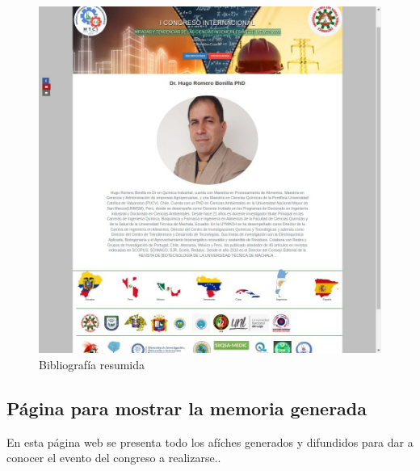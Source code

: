 \documentclass[a4paper,14px]{article}
\begin{document}
\hspace{0.5cm}
\begin{minipage}[H]{0.5\linewidth}
  \begin{figure}[H]
    \centering
    \includegraphics[scale=0.3]{bibliografia2.jpg}
    \caption{Bibliografía resumida}
    \label{fig:bibliografia}
  \end{figure}
\end{minipage}
  





\newpage
\subsection{Página para mostrar la memoria generada}
\label{sec:pagina-principal}

En esta página web se presenta todo los afíches generados y difundidos para dar a conocer el evento del congreso a realizarse..
\end{document}
